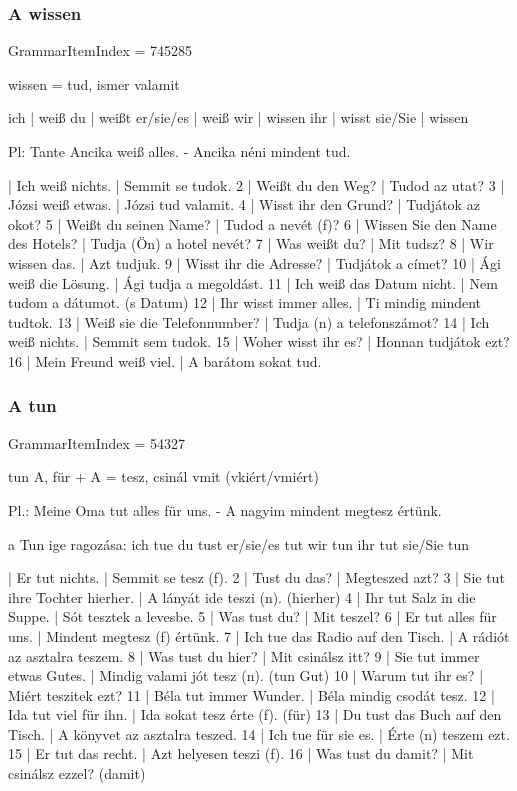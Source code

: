 \documentclass{article}
\newenvironment{desc}{\verbatim}{\endverbatim}
\newenvironment{exmp}{\verbatim}{\endverbatim}
\begin{document}
\subsubsection{A wissen}

GrammarItemIndex = 745285

\begin{desc}
wissen = tud, ismer valamit

ich       | weiß
du        | weißt
er/sie/es | weiß
wir       | wissen
ihr       | wisst
sie/Sie   | wissen

Pl: Tante Ancika weiß alles. - Ancika néni mindent tud.
\end{desc}

\begin{exmp}
1 | Ich weiß nichts. | Semmit se tudok.
2 | Weißt du den Weg? | Tudod az utat?
3 | Józsi weiß etwas. | Józsi tud valamit.
4 | Wisst ihr den Grund? | Tudjátok az okot?
5 | Weißt du seinen Name? | Tudod a nevét (f)?
6 | Wissen Sie den Name des Hotels? | Tudja (Ön) a hotel nevét?
7 | Was weißt du? | Mit tudsz?
8 | Wir wissen das. | Azt tudjuk.
9 | Wisst ihr die Adresse? | Tudjátok a címet?
10 | Ági weiß die Lösung. | Ági tudja a megoldást.
11 | Ich weiß das Datum nicht. | Nem tudom a dátumot. (s Datum)
12 | Ihr wisst immer alles. | Ti mindig mindent tudtok.
13 | Weiß sie die Telefonnumber? | Tudja (n) a telefonszámot?
14 | Ich weiß nichts. | Semmit sem tudok.
15 | Woher wisst ihr es? | Honnan tudjátok ezt?
16 | Mein Freund weiß viel. | A barátom sokat tud.
\end{exmp}

\subsubsection{A tun}

GrammarItemIndex = 54327

\begin{desc}
tun A, für + A = tesz, csinál vmit (vkiért/vmiért)

Pl.: Meine Oma tut alles für uns. - A nagyim mindent megtesz értünk.

a Tun ige ragozása:
ich tue
du tust
er/sie/es tut
wir tun
ihr tut
sie/Sie tun
\end{desc}

\begin{exmp}
1 | Er tut nichts. | Semmit se tesz (f).
2 | Tust du das? | Megteszed azt?
3 | Sie tut ihre Tochter hierher. | A lányát ide teszi (n). (hierher)
4 | Ihr tut Salz in die Suppe. | Sót tesztek a levesbe.
5 | Was tust du? | Mit teszel?
6 | Er tut alles für uns. | Mindent megtesz (f) értünk.
7 | Ich tue das Radio auf den Tisch. | A rádiót az asztalra teszem.
8 | Was tust du hier? | Mit csinálsz itt?
9 | Sie tut immer etwas Gutes. | Mindig valami jót tesz (n). (tun Gut)
10 | Warum tut ihr es? | Miért teszitek ezt?
11 | Béla tut immer Wunder. | Béla mindig csodát tesz.
12 | Ida tut viel für ihn. | Ida sokat tesz érte (f). (für)
13 | Du tust das Buch auf den Tisch. | A könyvet az asztalra teszed.
14 | Ich tue für sie es. | Érte (n) teszem ezt.
15 | Er tut das recht. | Azt helyesen teszi (f).
16 | Was tust du damit? | Mit csinálsz ezzel? (damit)
\end{exmp}
\end{document}
